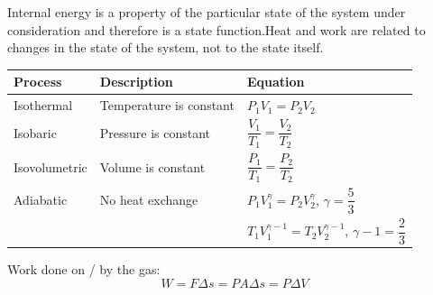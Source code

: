 Internal energy is a property of the particular state of the system under consideration and therefore is a state function.Heat and work are related to changes in the state of the
system, not to the state itself.
\begin{center}
\begin{tabularx}{\textwidth}{@{}|Y |Y |Y|@{}}
\toprule
\textbf{Process} & \textbf{Description} & \textbf{Equation} \\
\midrule
Isothermal & Temperature is constant & \(P_1V_1=P_2V_2\) \\\hline
Isobaric & Pressure is constant & \(\dfrac{V_1}{T_1}=\dfrac{V_2}{T_2}\) \\\hline
Isovolumetric & Volume is constant & \(\dfrac{P_1}{T_1}=\dfrac{P_2}{T_2}\) \\\hline
Adiabatic & No heat exchange & \(P_1V_1^{\gamma}=P_2V_2^{\gamma}\), $\gamma=\dfrac{5}{3}$ \\
 & & \(T_1V_1^{\gamma-1}=T_2V_2^{\gamma-1}\), $\gamma-1=\dfrac{2}{3}$\\
\bottomrule
\end{tabularx}
\end{center}
Work done on / by the gas:
\[W=F\Delta s=PA\Delta s=P\Delta V\]
